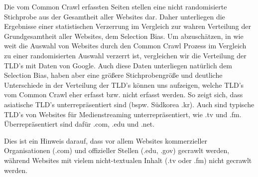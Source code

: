 \documentclass[a4paper,12pt,titlepage=false]{scrreprt}
\begin{document}
\vspace{.4cm}

Die vom Common Crawl erfassten Seiten stellen eine nicht randomisierte Stichprobe aus der Gesamtheit aller Websites dar. Daher unterliegen die Ergebnisse einer statistischen Verzerrung im Vergleich zur wahren Verteilung der Grundgesamtheit aller Websites, dem Selection Bias. Um abzuschätzen, in wie weit die Auswahl von Websites durch den Common Crawl Prozess im Vergleich zu einer randomisierten Auswahl verzerrt ist, vergleichen wir die Verteilung der TLD's mit Daten von Google. Auch diese Daten unterliegen natürlich dem Selection Bias, haben aber eine größere Stichprobengröße und deutliche Unterschiede in der Verteilung der TLD's können uns aufzeigen, welche TLD's vom Common Crawl eher erfasst bzw. nicht erfasst werden. So zeigt sich, dass asiatische TLD's unterrepräsentiert sind (bspw. Südkorea .kr). Auch sind typische TLD's von Websites für Medienstreaming unterrepräsentiert, wie .tv und .fm. Überrepräsentiert sind dafür .com, .edu und .net.

Dies ist ein Hinweis darauf, dass vor allem Websites kommerzieller Organisationen (.com) und offizieller Stellen (.edu, .gov) gecrawlt werden, während Websites mit vielem nicht-textualen Inhalt (.tv oder .fm) nicht gecrawlt werden.

\vspace{.1cm}
\end{document}
